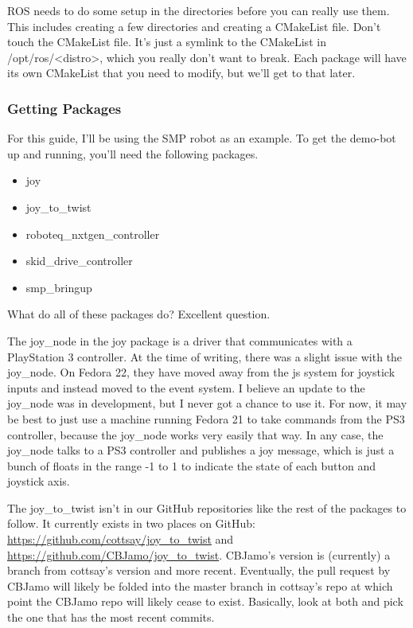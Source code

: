 ROS needs to do some setup in the directories before you can really use them. This includes creating a few directories and creating a CMakeList file. Don't touch the CMakeList file. It's just a symlink to the CMakeList in /opt/ros/<distro>, which you really don't want to break. Each package will have its own CMakeList that you need to modify, but we'll get to that later.

\subsubsection{Getting Packages}

 For this guide, I'll be using the SMP robot as an example. To get the demo-bot up and running, you'll need the following packages.

\begin{itemize}
\item{joy}
\item{joy\_to\_twist}
\item{roboteq\_nxtgen\_controller}
\item{skid\_drive\_controller}
\item{smp\_bringup}
\end{itemize}

What do all of these packages do? Excellent question.

The joy\_node in the joy package is a driver that communicates with a PlayStation 3 controller. At the time of writing, there was a slight issue with the joy\_node. On Fedora 22, they have moved away from the js system for joystick inputs and instead moved to the event system. I believe an update to the joy\_node was in development, but I never got a chance to use it. For now, it may be best to just use a machine running Fedora 21 to take commands from the PS3 controller, because the joy\_node works very easily that way. In any case, the joy\_node talks to a PS3 controller and publishes a joy message, which is just a bunch of floats in the range -1 to 1 to indicate the state of each button and joystick axis.

The joy\_to\_twist isn't in our GitHub repositories like the rest of the packages to follow. It currently exists in two places on GitHub: \url{https://github.com/cottsay/joy_to_twist} and \url{https://github.com/CBJamo/joy_to_twist}. CBJamo's version is (currently) a branch from cottsay's version and more recent. Eventually, the pull request by CBJamo will likely be folded into the master branch in cottsay's repo at which point the CBJamo repo will likely cease to exist. Basically, look at both and pick the one that has the most recent commits.

